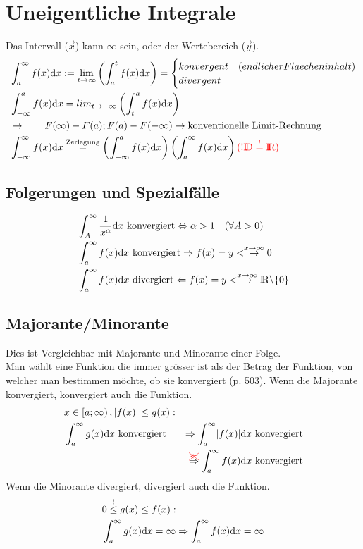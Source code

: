 \section{Uneigentliche Integrale}
Das Intervall ($\vec{x}$) kann $\infty$ sein, oder der Wertebereich ($\vec{y}$).
\begin{align*}
&\int_a^\infty f(x)\mathrm{d}x:=\lim_{t\rightarrow\infty}\left(\int_a^t f(x)\mathrm{d}x\right) = 
	\begin{cases} 
		 konvergent & (endlicher Flaecheninhalt)\\
		divergent
	\end{cases}
	\\
	&\int_{-\infty}^{a}f(x)\mathrm{d}x = lim_{t\rightarrow-\infty}\left(\int_t^af(x)\mathrm{d}x\right)\\
	&\rightarrow\qquad F(\infty)-F(a);F(a)-F(-\infty) \rightarrow \text{konventionelle Limit-Rechnung}\\
	&\int^\infty_{-\infty}f(x)\mathrm{d}x\stackrel{\text{Zerlegung}}{=}\left(\int^a_{-\infty}f(x)\mathrm{d}x\right)\left(\int^\infty_af(x)\mathrm{d}x\right) \color{red}{(! \text{\rmfamily I\!D}\stackrel{!}{=}\text{\rmfamily I\!R})}
\end{align*}
\subsection{Folgerungen und Spezialfälle}
\begin{align*}
&\int^\infty_A \frac{1}{x^\alpha}\mathrm{d}x \text{ konvergiert} \Leftrightarrow\alpha>1\quad(\forall A>0)\\
&\int^\infty_af(x)\mathrm{d}x \text{ konvergiert} \Rightarrow f(x)=y< \stackrel{x\rightarrow\infty}{\rightarrow}0 \\
&\int^\infty_af(x)\mathrm{d}x \text{ divergiert} \Leftarrow f(x)=y< \stackrel{x\rightarrow\infty}{\rightarrow}\text{\rmfamily I\!R}\backslash \{0\} 
\end{align*}
\subsection{Majorante/Minorante}
Dies ist Vergleichbar mit Majorante und Minorante einer Folge.\\
Man wählt eine Funktion die immer grösser ist als der Betrag der Funktion, von welcher man bestimmen möchte, ob sie konvergiert ({\color{red}p. 503}). Wenn die Majorante konvergiert, konvergiert auch die Funktion.
\begin{align*}
& x \in\left[a;\infty\right),\lvert f(x)\rvert \leq g(x):\\
&\int^\infty_a g(x)\mathrm{d}x \text{ konvergiert}&\Rightarrow\int^\infty_a \lvert f(x)\rvert\mathrm{d}x \text{ konvergiert}\\
&&\stackrel{{\color{red}\xcancel{\Leftarrow}}}{\Rightarrow}\int^\infty_af(x)\mathrm{d}x \text{ konvergiert}
\end{align*}
Wenn die Minorante divergiert, divergiert auch die Funktion.
\begin{align*}
&0\stackrel{!}{\leq}g(x)\leq f(x):\\
&\int^\infty_a g(x)\mathrm{d}x=\infty \Rightarrow\int^\infty_af(x)\mathrm{d}x =\infty
\end{align*}

